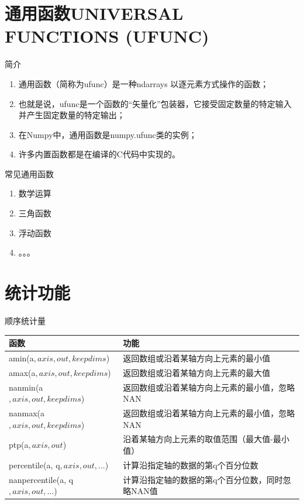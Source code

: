 \documentclass[ignorenonframetext,11pt,xcolor=dvipsnames,hyperref={colorlinks,allcolors=.,urlcolor=blue, citecolor=violet, bookmarksdepth=4},aspectratio=1610]{beamer}
\providecommand{\tightlist}{%
  \setlength{\itemsep}{0pt}\setlength{\parskip}{0pt}}
\begin{document}
\hypertarget{universal-functions-ufunc}{%
\section{通用函数UNIVERSAL FUNCTIONS
(UFUNC)}\label{universal-functions-ufunc}}

\begin{frame}{简介}
\protect\hypertarget{section-24}{}

\begin{enumerate}
\tightlist
\item
  通用函数（简称为ufunc）是一种ndarrays 以逐元素方式操作的函数；
\item
  也就是说，ufunc是一个函数的``矢量化''包装器，它接受固定数量的特定输入并产生固定数量的特定输出；
\item
  在Numpy中，通用函数是numpy.ufunc类的实例；
\item
  许多内置函数都是在编译的C代码中实现的。
\end{enumerate}

\end{frame}

\begin{frame}{常见通用函数}
\protect\hypertarget{section-25}{}

\begin{enumerate}
\tightlist
\item
  数学运算
\item
  三角函数
\item
  浮动函数
\item
  。。。
\end{enumerate}

\end{frame}

\hypertarget{section-26}{%
\section{统计功能}\label{section-26}}

\begin{frame}{顺序统计量}
\protect\hypertarget{section-27}{}

\begin{longtable}[]{@{}ll@{}}
\toprule
函数 & 功能\tabularnewline
\midrule
\endhead
amin(a\(, axis, out, keepdims\)) &
返回数组或沿着某轴方向上元素的最小值\tabularnewline
amax(a\(, axis, out, keepdims\)) &
返回数组或沿着某轴方向上元素的最大值\tabularnewline
nanmin(a\(, axis, out, keepdims\)) &
返回数组或沿着某轴方向上元素的最小值，忽略NAN\tabularnewline
nanmax(a\(, axis, out, keepdims\)) &
返回数组或沿着某轴方向上元素的最小值，忽略NAN\tabularnewline
ptp(a\(, axis, out\)) &
沿着某轴方向上元素的取值范围（最大值-最小值）\tabularnewline
percentile(a, q\(, axis, out, ...\)) &
计算沿指定轴的数据的第q个百分位数\tabularnewline
nanpercentile(a, q\(, axis, out, ...\)) &
计算沿指定轴的数据的第q个百分位数，同时忽略NAN值\tabularnewline
\bottomrule
\end{longtable}

\end{frame}
\end{document}
